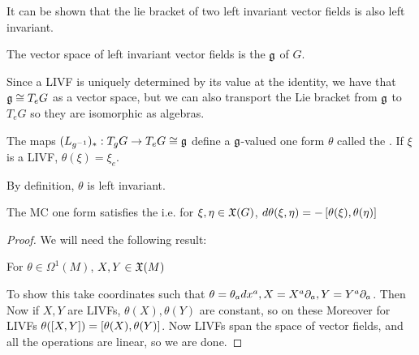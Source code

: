 \documentclass{article}
\begin{document}
It can be shown that the lie bracket of two left invariant vector fields is also left invariant. 
\begin{definition}
	The vector space of left invariant vector fields is the  $\mf{g}$ of $G$. 
\end{definition}
Since a LIVF is uniquely determined by its value at the identity, we have that $\mf{g} \cong T_e G$ as a vector space, but we can also transport the Lie bracket from $\mf{g}$ to $T_e G$ so they are isomorphic as algebras. 
\begin{definition}
	The maps $(L_{g^{-1}})_\ast : T_g G \to T_e G \cong \mf{g}$ define a $\mf{g}$-valued one form $\theta$ called the . If $\xi$ is a LIVF, $\theta(\xi) = \xi_e$. 
\end{definition}
By definition, $\theta$ is left invariant. 
\begin{theorem}
	The MC one form satisfies the  
	i.e. for $\xi,\eta \in \mf{X}(G)$, $d\theta(\xi,\eta) = -\comm[\theta(\xi)]{\theta(\eta)}$
\end{theorem}
\begin{proof}
	We will need the following result:
	\begin{claim}
		For $\theta \in \Omega^1(M)$, $X,Y \in \mf{X}(M)$
	\end{claim}
	To show this take coordinates such that $\theta = \theta_a dx^a, X = X^a \del_a, Y=Y^a \del_a$. Then 
	Now if $X,Y$ are LIVFs, $\theta(X), \theta(Y)$ are constant, so on these 
	Moreover for LIVFs $\theta(\comm[X]{Y}) = \comm[\theta(X)]{\theta(Y)}$. Now LIVFs span the space of vector fields, and all the operations are linear, so we are done. 
\end{proof}
\end{document}

